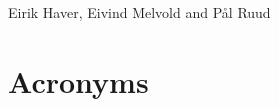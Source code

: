 \documentclass[pdftex,english,10pt,b5paper,twoside]{book}
\begin{document}
\begin{center}
Eirik Haver, Eivind Melvold and Pål Ruud
\vspace{13pt}

\end{center}

\tableofcontents

\cleardoublepage
{}
{}
\listoffigures

\cleardoublepage
{}
{}
\listoftables

\cleardoublepage
{}
{}
\lstlistoflistings
\cleardoublepage

\chapter*{Acronyms}
\end{document}
